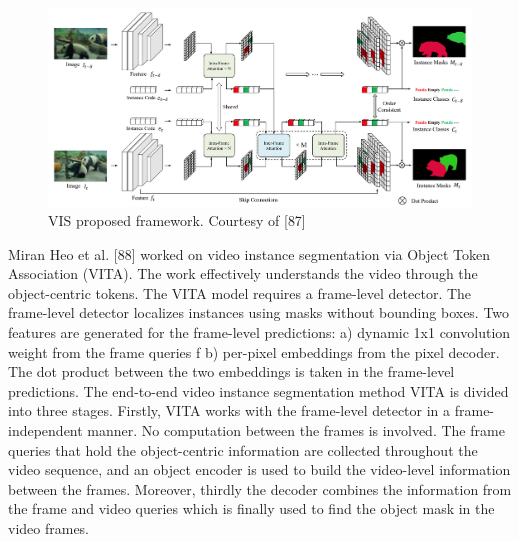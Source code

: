     \begin{figure}
		\centering
		\includegraphics[width=13cm]{images/VIS.png}
		\caption{VIS proposed framework. Courtesy of [87]}
		\label{fig:vis}
	\end{figure}
	Miran Heo et al. [88] worked on video instance segmentation via Object Token Association (VITA). The work effectively understands the video through the object-centric tokens. The VITA model requires a frame-level detector. The frame-level detector localizes instances using masks without bounding boxes. Two features are generated for the frame-level predictions: a) dynamic 1x1 convolution weight from the frame queries f b) per-pixel embeddings from the pixel decoder. The dot product between the two embeddings is taken in the frame-level predictions. The end-to-end video instance segmentation method VITA is divided into three stages. Firstly, VITA works with the frame-level detector in a frame-independent manner. No computation between the frames is involved. The frame queries that hold the object-centric information are collected throughout the video sequence, and an object encoder is used to build the video-level information between the frames. Moreover, thirdly the decoder combines the information from the frame and video queries which is finally used to find the object mask in the video frames. 
	
